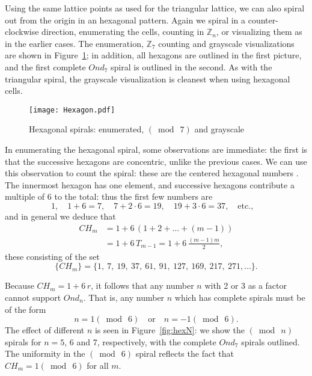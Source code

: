 \documentclass{article}
\theoremstyle{definition}
\def\ZZ{\mathbb{Z}}
\def\pmod#1{(\bmod\  #1)}
\def\com#1{\quad\text{{#1}}\quad}
\begin{document}
Using the same lattice points as used for the triangular lattice, we
can also spiral out from the origin in an hexagonal pattern.  Again we
spiral in a counter-clockwise direction, enumerating the cells,
counting in $\ZZ_n$, or visualizing them as in the earlier cases.  The
enumeration, $\ZZ_7$ counting and grayscale visualizations are shown
in Figure~\ref{fig:hex}; in addition, all hexagons are outlined in the
first picture, and the first complete $Ond_7$ spiral is outlined in
the second.  As with the triangular spiral, the grayscale
visualization is cleanest when using hexagonal cells.

\begin{figure}[htb]
  \centering
  \texttt{[image: Hexagon.pdf]}
  \caption{Hexagonal spirals: enumerated, $\pmod 7$ and grayscale}
  \label{fig:hex}
\end{figure}

In enumerating the hexagonal spiral, some observations are immediate:
the first is that the successive hexagons are concentric, unlike the
previous cases.  We can use this observation to count the spiral:
these are the centered hexagonal numbers \cite{OEIS}.  The innermost hexagon has
one element, and successive hexagons contribute a multiple of 6 to the
total: thus the first few numbers are
\[
  1,\quad 1+6=7,\quad 7+2\cdot6=19,\quad 19+3\cdot6=37, \com{etc.,}
\]
and in general we deduce that
\begin{align*}
  CH_m &= 1 + 6\,(1 + 2 + \dots + (m-1) ) \\
       &= 1 + 6\,T_{m-1} = 1 + 6\,\textstyle{\frac{(m-1)m}2},
\end{align*}
these consisting of the set
\[
  \{CH_m\} = \{ 1,\ 7,\ 19,\ 37,\ 61,\ 91,\ 
        127,\ 169,\ 217,\ 271,\ldots \}.
\]

Because $CH_m = 1+6\,r$, it follows that any number $n$ with 2 or 3 as
a factor cannot support $Ond_n$.  That is, any number $n$ which has
complete spirals must be of the form
\[
  n = 1 \pmod 6  \com{or}  n = -1 \pmod 6.
\]
The effect of different $n$ is seen in Figure~\ref{fig:hexN}: we show
the $\pmod n$ spirals for $n=5$, 6 and 7, respectively, with the
complete $Ond_7$ spirals outlined.  The uniformity in the $\pmod6$
spiral reflects the fact that $CH_m=1\pmod6$ for all $m$.
\end{document}

